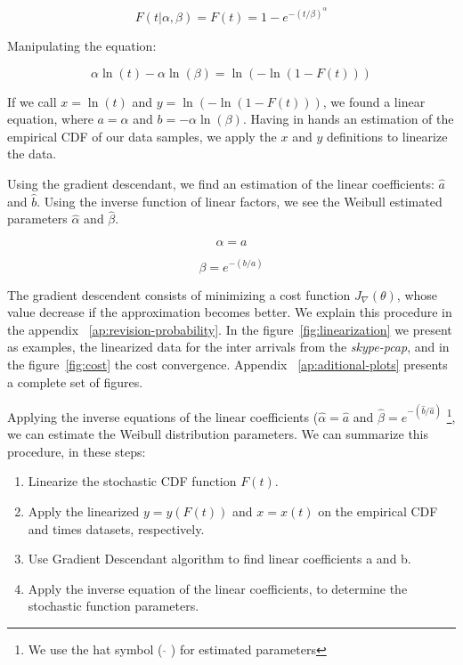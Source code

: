 \begin{equation}
F(t|\alpha, \beta) = F(t) = 1 - e^{-(t/\beta)^{\alpha}}
\end{equation}

Manipulating the equation:

\begin{equation}
\alpha\ln{(t)} - \alpha\ln{(\beta)} = \ln{(-\ln{(1 - F(t))})}
\end{equation}

If we call $x = \ln{(t)}$ and $y = \ln{(-\ln{(1 - F(t))})}$, we found a linear equation, where  $a = \alpha$ and $b = -\alpha\ln{(\beta)}$. Having in hands an estimation of the empirical CDF of our data samples, we apply the $x$ and $y$ definitions to linearize the data.

Using the gradient descendant, we find an estimation of the linear coefficients: $\hat{a}$ and  $\hat{b}$.  Using the inverse function of linear factors, we see the Weibull estimated parameters  $\hat{\alpha}$ and $\hat{\beta}$.

\begin{equation}
\alpha = a
\end{equation}

\begin{equation}
\beta = e^{-(b/a)}
\end{equation}


The gradient descendent consists of minimizing a cost function $J_\nabla(\theta)$, whose value decrease if the approximation becomes better. We explain this procedure in the appendix ~\ref{ap:revision-probability}. In the figure~\ref{fig:linearization} we present as examples, the linearized data for the inter arrivals from the \textit{skype-pcap}, and in the figure~\ref{fig:cost} the cost convergence. Appendix ~\ref{ap:aditional-plots} presents a complete set of figures.

Applying the inverse equations of the linear coefficients ($\hat{\alpha} = \hat{a}$ and $\hat{\beta} = e^{-(\hat{b}/\hat{a})}$  \footnote{We use the hat symbol ( $ \widehat{} $ ) for estimated parameters}, we can estimate the Weibull distribution parameters. We can summarize this procedure, in these steps:

\begin{enumerate}
\item Linearize the stochastic CDF function $F(t)$.
\item Apply the linearized  $y = y(F(t))$ and $x = x(t)$ on the empirical CDF and times datasets, respectively.
\item Use Gradient Descendant algorithm to find linear coefficients a and b.
\item Apply the inverse equation of the linear coefficients, to determine the stochastic function parameters.
\end{enumerate}



